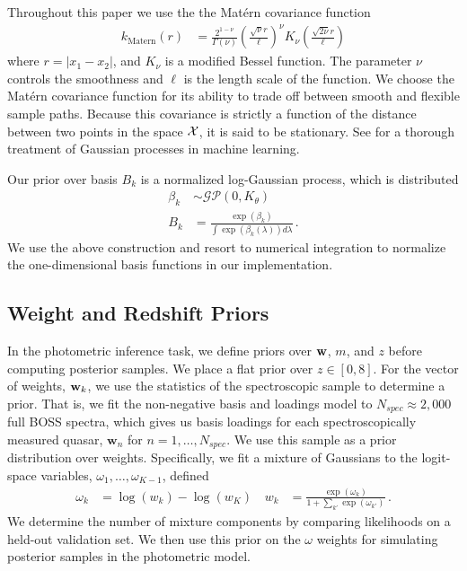 \documentclass{article} %
\begin{document}
Throughout this paper we use the the Mat\'{e}rn \cite{Matern1986spatial} covariance function
\begin{align}
  k_{\text{Matern}}(r)
    &= \frac{2^{1-\nu}}{\Gamma(\nu)} 
       \left( \frac{\sqrt{\nu} r}{\ell} \right) ^\nu
       K_\nu\left( \frac{\sqrt{2\nu} r}{\ell}\right)
\end{align}
where ${r = |x_1 - x_2|}$, and $K_\nu$ is a modified Bessel function.  The parameter $\nu$ controls the smoothness and $\ell$ is the length scale of the function.  
We choose the Mat\'{e}rn covariance function for its ability to trade off between smooth and flexible sample paths.  
Because this covariance is strictly a function of the distance between two points in the space $\mathcal{X}$, it is said to be stationary. 
See \cite{rasmussen2006gaussian} for a thorough treatment of Gaussian processes in machine learning. 

Our prior over basis $B_k$ is a normalized log-Gaussian process, which is distributed
\begin{align}
	\beta_k &\sim \mathcal{GP}(0, K_\theta) \\
	B_k &= \frac{\exp(\beta_k)}{ \int \exp(\beta_k(\lambda)) d\lambda} \, .
\end{align}
We use the above construction and resort to numerical integration to normalize the one-dimensional basis functions in our implementation. 

\subsection{Weight and Redshift Priors}
In the photometric inference task, we define priors over $\mathbf{w}$, $m$, and $z$ before computing posterior samples.  We place a flat prior over $z \in [0, 8]$.  For the vector of weights, $\mathbf{w}_k$, we use the statistics of the spectroscopic sample to determine a prior.  That is, we fit the non-negative basis and loadings model to $N_{spec} \approx 2,000$ full BOSS spectra, which gives us basis loadings for each spectroscopically measured quasar, $\mathbf{w}_n$ for $n = 1, \dots, N_{spec}$.  
We use this sample as a prior distribution over weights.  Specifically, we fit a mixture of Gaussians to the logit-space variables, $\omega_1, \dots, \omega_{K-1}$, defined 
\begin{align}
  \omega_k &= \log(w_k) - \log(w_K) \, & 
  w_k &= \frac{\exp(\omega_k)}{1 + \sum_{k'} \exp(\omega_{k'})} \, .
\end{align}
We determine the number of mixture components by comparing likelihoods on a held-out validation set.  
We then use this prior on the $\omega$ weights for simulating posterior samples in the photometric model.  
\end{document}
